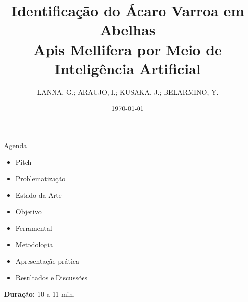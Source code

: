 \documentclass[aspectratio=169]{beamer}
\title{Identificação do Ácaro Varroa em Abelhas \\ Apis Mellifera por
Meio de Inteligência Artificial}
\subtitle{}
\author[DSM]{LANNA, G.; ARAUJO, I.; KUSAKA, J.; BELARMINO, Y.}
\institute{Desenvolvimento de Software Multiplataforma\\FATEC Registro}
\date{\today}
\begin{document}
\begin{frame}
  \vspace{0.8cm}
  \begin{center}
    
    \vspace{0.4cm}
    
    {\normalsize\bfseries\inserttitle}\par
    
    \vspace{0.2cm}
    
    {\tiny\insertauthor}\par
    
    \vspace{0.1cm}
    
    {\small\textcolor{azulComplementar}{\insertsubtitle}}\par
    
    \vspace{0.5cm}
    
    
    \vspace{0.3cm}
    
    {\scriptsize\insertinstitute}\par
    
    \vspace{0.01cm}
    
    {\tiny\textcolor{azulComplementar}{\insertdate}}\par
  \end{center}
\end{frame}

\begin{frame}[b]{Agenda}
  \begin{itemize}
    \item Pitch
    \item Problematização
    \item Estado da Arte
    \item Objetivo
    \item Ferramental
    \item Metodologia
    \item Apresentação prática
    \item Resultados e Discussões
  \end{itemize}
  
  \vfill
  
  \hfill{\scriptsize \textbf{Duração:} 10 a 11 min.}
\end{frame}
\end{document}
